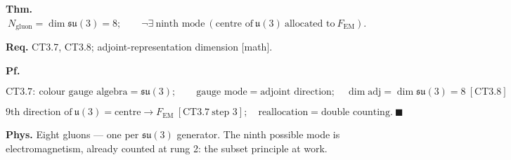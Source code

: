 \begin{theorem}\label{tag:CT3-13}
\textbf{Thm.} $\ N_{\mathrm{gluon}}=\dim\mathfrak{su}(3)=8;\qquad\neg\exists\ \text{ninth mode}\ (\text{centre of}\ \mathfrak u(3)\ \text{allocated to}\ F_{\mathrm{EM}}).$

\textbf{Req.} CT3.7, CT3.8; adjoint-representation dimension [math].

\textbf{Pf.}

\[
\mathrm{CT3.7}:\ \text{colour gauge algebra}=\mathfrak{su}(3);\qquad
\text{gauge mode}=\text{adjoint direction};\quad\dim\mathrm{adj}=\dim\mathfrak{su}(3)=8\ [\mathrm{CT3.8}]
\]

\[
\text{9th direction of}\ \mathfrak u(3)=\text{centre}\to F_{\mathrm{EM}}\ [\mathrm{CT3.7}\ \text{step 3}];\quad\text{reallocation}=\text{double counting}.\ \blacksquare
\]

\textbf{Phys.} Eight gluons — one per $\mathfrak{su}(3)$ generator. The ninth possible mode is electromagnetism, already counted at rung 2: the subset principle at work.

\end{theorem}

